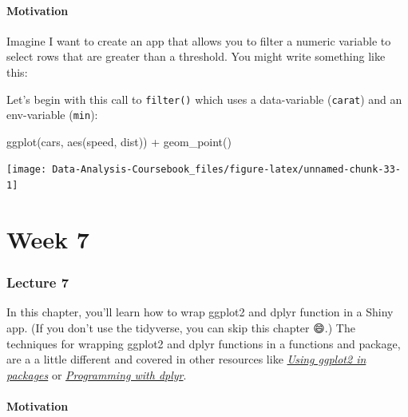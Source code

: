 \documentclass[
]{article}
\newenvironment{Shaded}{\begin{snugshade}}{\end{snugshade}}
\newcommand{\FunctionTok}[1]{\textcolor[rgb]{0.00,0.00,0.00}{#1}}
\newcommand{\NormalTok}[1]{#1}
\newcommand{\SpecialCharTok}[1]{\textcolor[rgb]{0.00,0.00,0.00}{#1}}
\begin{document}
\hypertarget{tidy-motivation}{%
\subsection{Motivation}\label{tidy-motivation}}

Imagine I want to create an app that allows you to filter a numeric variable to select rows that are greater than a threshold.
You might write something like this:

Let's begin with this call to \texttt{filter()} which uses a data-variable (\texttt{carat}) and an env-variable (\texttt{min}):

\begin{Shaded}
\begin{Highlighting}[]
\FunctionTok{ggplot}\NormalTok{(cars, }\FunctionTok{aes}\NormalTok{(speed, dist)) }\SpecialCharTok{+} 
  \FunctionTok{geom\_point}\NormalTok{()}
\end{Highlighting}
\end{Shaded}

\begin{center}\texttt{[image: Data-Analysis-Coursebook\_files/figure-latex/unnamed-chunk-33-1]} \end{center}

\hypertarget{part-week-7}{%
\part*{Week 7}\label{part-week-7}}

\hypertarget{lecture7}{%
\section{Lecture 7}\label{lecture7}}

In this chapter, you'll learn how to wrap ggplot2 and dplyr function in a Shiny app.
(If you don't use the tidyverse, you can skip this chapter 😄.) The techniques for wrapping ggplot2 and dplyr functions in a functions and package, are a a little different and covered in other resources like \href{http://ggplot2.tidyverse.org/dev/articles/ggplot2-in-packages.html}{\emph{Using ggplot2 in packages}} or \href{http://dplyr.tidyverse.org/articles/programming.html}{\emph{Programming with dplyr}}.

\hypertarget{tidy-motivation}{%
\subsection{Motivation}\label{tidy-motivation}}
\end{document}
